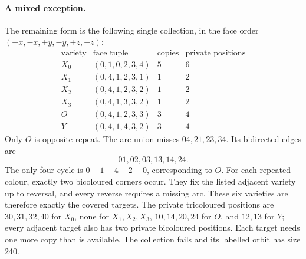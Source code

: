 \paragraph{A mixed exception.}
The remaining form is the following single collection, in the face order
$(+x,-x,+y,-y,+z,-z)$:
\[
\begin{array}{c|c|c|c}
 \text{variety}&\text{face tuple}&\text{copies}&\text{private positions}\\\hline
 X_0&(0,1,0,2,3,4)&5&6\\
 X_1&(0,4,1,2,3,1)&1&2\\
 X_2&(0,4,1,2,3,2)&1&2\\
 X_3&(0,4,1,3,3,2)&1&2\\
 O&(0,4,1,2,3,3)&3&4\\
 Y&(0,4,1,4,3,2)&3&4
\end{array}
\]
Only $O$ is opposite-repeat. The arc union misses $04,21,23,34$.
Its bidirected edges are
\[01,02,03,13,14,24.\]
The only four-cycle is
$0\!-\!1\!-\!4\!-\!2\!-\!0$, corresponding to $O$. For each repeated colour,
exactly two bicoloured corners occur. They fix the listed adjacent variety
up to reversal, and every reverse requires a missing arc. These six
varieties are therefore exactly the covered targets. The private
tricoloured positions are $30,31,32,40$ for $X_0$, none for $X_1,X_2,X_3$,
$10,14,20,24$ for $O$, and $12,13$ for $Y$; every adjacent target also has
two private bicoloured positions. Each target needs one more copy than is
available. The collection fails and its labelled orbit has size 240.

